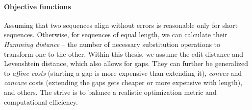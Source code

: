 \paragraph{Objective functions}
Assuming that two sequences align without errors is reasonable only for short
sequences. Otherwise, for sequences of equal length, we can calculate their
\emph{Hamming distance} -- the number of necessary substitution operations to
transform one to the other. Within this thesis, we assume the edit distance and
Levenshtein distance, which also allows for gaps. They can further be
generalized to \emph{affine costs} (starting a gap is more expensive than
extending it), \emph{convex} and \emph{concave} costs (extending the gaps gets
cheaper or more expensive with length), and others. The strive is to balance a
realistic optimization metric and computational efficiency.